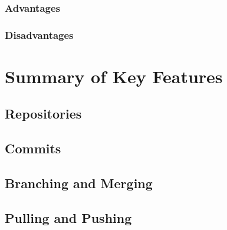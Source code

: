 \subsubsection{Advantages}
\subsubsection{Disadvantages}
\section{Summary of Key Features}
\subsection{Repositories}
\subsection{Commits}
\subsection{Branching and Merging}
\subsection{Pulling and Pushing}
